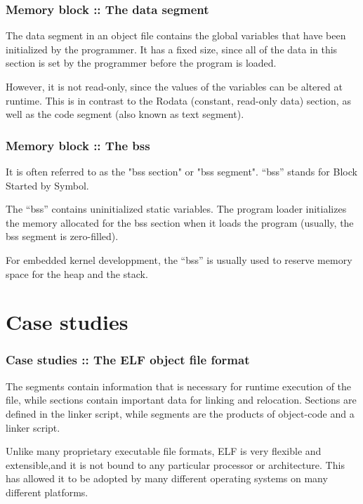 
\begin{frame}
  \frametitle{Memory block :: The data segment}

The data segment in an object file contains the global variables that
have been initialized by the programmer. It has a fixed size, since all
of the data in this section is set by
the programmer before the program is loaded.

\-

However, it is not read-only,
since the values of the variables can be altered at runtime.
This is in contrast to the Rodata (constant, read-only data) section,
as well as the code segment (also known as text segment).

\end{frame}


\begin{frame}
  \frametitle{Memory block :: The bss}

It is often referred to as the
"bss section" or "bss segment". ``bss'' stands for Block Started by Symbol.

\-

The ``bss'' contains uninitialized static variables. The program loader initializes the
memory allocated for the bss section when it loads the program (usually,
the bss segment is zero-filled).

\-

For embedded kernel developpment, the ``bss'' is usually used to reserve memory space 
for the heap and the stack.

\end{frame}



%
%

\section{Case studies}


\begin{frame}
  \frametitle{Case studies :: The ELF object file format}

The segments contain information that is necessary for runtime execution
of the file, while sections contain important data for linking and
relocation. Sections are defined in the linker script, while segments are
the products of object-code and a linker script.

\-

Unlike many proprietary executable file formats, ELF is very flexible and
extensible,and it is not bound to any particular processor or architecture. This has allowed
it to be adopted by many different operating systems on many different platforms.

\end{frame}

